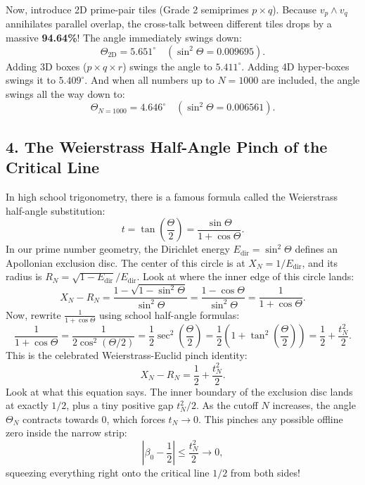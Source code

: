 \documentclass[11pt,a4paper]{article}
\theoremstyle{definition}
\begin{document}
Now, introduce 2D prime-pair tiles (Grade 2 semiprimes $p \times q$). Because $v_p \wedge v_q$ annihilates parallel overlap, the cross-talk between different tiles drops by a massive \textbf{94.64\%}! The angle immediately swings down:
\begin{equation}
\Theta_{\text{2D}} = 5.651^\circ \quad (\sin^2\Theta = 0.009695).
\end{equation}
Adding 3D boxes ($p \times q \times r$) swings the angle to $5.411^\circ$. Adding 4D hyper-boxes swings it to $5.409^\circ$. And when all numbers up to $N = 1000$ are included, the angle swings all the way down to:
\begin{equation}
\Theta_{N=1000} = 4.646^\circ \quad (\sin^2\Theta = 0.006561).
\end{equation}

\subsection{4. The Weierstrass Half-Angle Pinch of the Critical Line}
In high school trigonometry, there is a famous formula called the Weierstrass half-angle substitution:
\begin{equation}
t = \tan\left(\frac{\Theta}{2}\right) = \frac{\sin\Theta}{1 + \cos\Theta}.
\end{equation}
In our prime number geometry, the Dirichlet energy $E_{\mathrm{dir}} = \sin^2\Theta$ defines an Apollonian exclusion disc. The center of this circle is at $X_N = 1 / E_{\mathrm{dir}}$, and its radius is $R_N = \sqrt{1 - E_{\mathrm{dir}}} / E_{\mathrm{dir}}$. Look at where the inner edge of this circle lands:
\begin{equation}
X_N - R_N = \frac{1 - \sqrt{1 - \sin^2\Theta}}{\sin^2\Theta} = \frac{1 - \cos\Theta}{\sin^2\Theta} = \frac{1}{1 + \cos\Theta}.
\end{equation}
Now, rewrite $\frac{1}{1 + \cos\Theta}$ using school half-angle formulas:
\begin{equation}
\frac{1}{1 + \cos\Theta} = \frac{1}{2 \cos^2(\Theta/2)} = \frac{1}{2} \sec^2\left(\frac{\Theta}{2}\right) = \frac{1}{2} \left(1 + \tan^2\left(\frac{\Theta}{2}\right)\right) = \frac{1}{2} + \frac{t_N^2}{2}.
\end{equation}
This is the celebrated Weierstrass-Euclid pinch identity:
\begin{equation}
X_N - R_N = \frac{1}{2} + \frac{t_N^2}{2}.
\end{equation}
Look at what this equation says. The inner boundary of the exclusion disc lands at exactly $1/2$, plus a tiny positive gap $t_N^2 / 2$. As the cutoff $N$ increases, the angle $\Theta_N$ contracts towards $0$, which forces $t_N \to 0$. This pinches any possible offline zero inside the narrow strip:
\begin{equation}
\left|\beta_0 - \frac{1}{2}\right| \le \frac{t_N^2}{2} \to 0,
\end{equation}
squeezing everything right onto the critical line $1/2$ from both sides!
\end{document}
